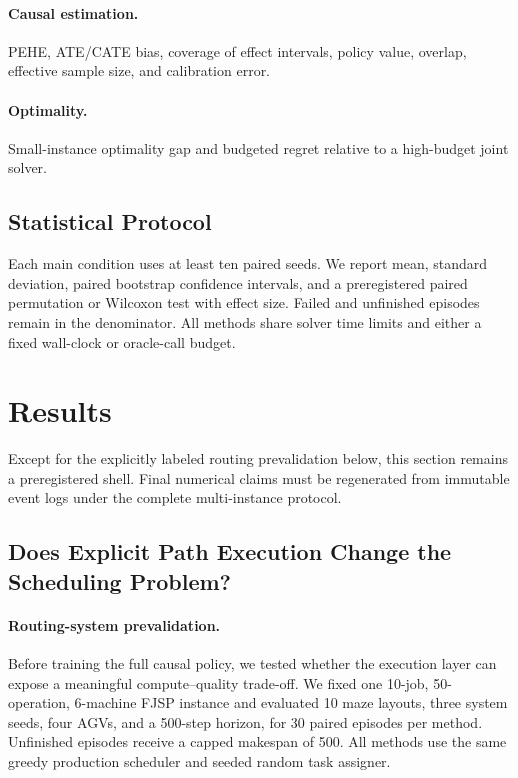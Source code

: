 \documentclass[11pt,a4paper]{article}
\begin{document}
\paragraph{Causal estimation.}
PEHE, ATE/CATE bias, coverage of effect intervals, policy value, overlap,
effective sample size, and calibration error.

\paragraph{Optimality.}
Small-instance optimality gap and budgeted regret relative to a high-budget
joint solver.

\subsection{Statistical Protocol}

Each main condition uses at least ten paired seeds. We report mean, standard
deviation, paired bootstrap confidence intervals, and a preregistered paired
permutation or Wilcoxon test with effect size. Failed and unfinished episodes
remain in the denominator. All methods share solver time limits and either a
fixed wall-clock or oracle-call budget.

\section{Results}
\label{sec:results}

Except for the explicitly labeled routing prevalidation below, this section
remains a preregistered shell. Final numerical claims must be regenerated from
immutable event logs under the complete multi-instance protocol.

\subsection{Does Explicit Path Execution Change the Scheduling Problem?}

\paragraph{Routing-system prevalidation.}
Before training the full causal policy, we tested whether the execution layer
can expose a meaningful compute--quality trade-off. We fixed one
10-job, 50-operation, 6-machine FJSP instance and evaluated 10 maze layouts,
three system seeds, four AGVs, and a 500-step horizon, for 30 paired episodes
per method. Unfinished episodes receive a capped makespan of 500. All methods
use the same greedy production scheduler and seeded random task assigner.
\end{document}
